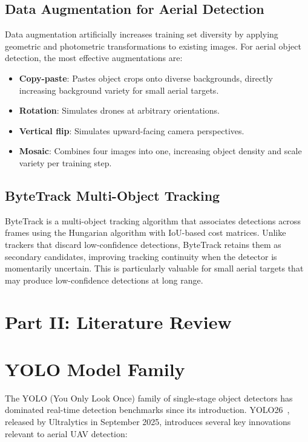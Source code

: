 \documentclass[12pt,a4paper]{report}
\begin{document}
\subsection{Data Augmentation for Aerial Detection}

Data augmentation artificially increases training set diversity by applying
geometric and photometric transformations to existing images. For aerial
object detection, the most effective augmentations are:
\begin{itemize}
  \item \textbf{Copy-paste}: Pastes object crops onto diverse backgrounds,
        directly increasing background variety for small aerial targets.
  \item \textbf{Rotation}: Simulates drones at arbitrary orientations.
  \item \textbf{Vertical flip}: Simulates upward-facing camera perspectives.
  \item \textbf{Mosaic}: Combines four images into one, increasing object
        density and scale variety per training step.
\end{itemize}

\subsection{ByteTrack Multi-Object Tracking}

ByteTrack is a multi-object tracking algorithm that associates detections
across frames using the Hungarian algorithm with IoU-based cost matrices.
Unlike trackers that discard low-confidence detections, ByteTrack retains
them as secondary candidates, improving tracking continuity when the detector
is momentarily uncertain. This is particularly valuable for small aerial
targets that may produce low-confidence detections at long range.

\section*{Part II: Literature Review}

\section{YOLO Model Family}

The YOLO (You Only Look Once) family of single-stage object detectors has
dominated real-time detection benchmarks since its introduction. YOLO26~\cite{ultralytics2025},
released by Ultralytics in September 2025, introduces several key innovations
relevant to aerial UAV detection:
\end{document}
